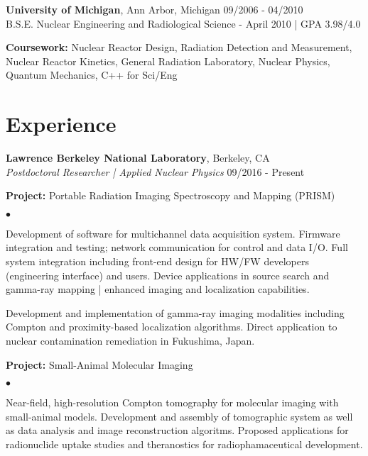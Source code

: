 \documentclass[margin,line]{res}
\newenvironment{list1}{
  \begin{list}{\ding{113}}{%
      \setlength{\itemsep}{0in}
      \setlength{\parsep}{0in} \setlength{\parskip}{0in}
      \setlength{\topsep}{0in} \setlength{\partopsep}{0in} 
      \setlength{\leftmargin}{0.17in}}}{\end{list}}
\newenvironment{list2}{
  \begin{list}{$\bullet$}{%
      \setlength{\itemsep}{0in}
      \setlength{\parsep}{0in} \setlength{\parskip}{0in}
      \setlength{\topsep}{0in} \setlength{\partopsep}{0in} 
      \setlength{\leftmargin}{0.2in}}}{\end{list}}
\begin{document}
\begin{resume}
{\bf University of Michigan}, Ann Arbor, Michigan \hfill 09/2006 - 04/2010\\
B.S.E. Nuclear Engineering and Radiological Science - April 2010 | GPA 3.98/4.0
\begin{list1}
\item[] {\bf \small Coursework:} Nuclear Reactor Design, Radiation Detection 
                                 and Measurement, Nuclear Reactor Kinetics,
                                 General Radiation Laboratory, Nuclear Physics,
                                 Quantum Mechanics, C++ for Sci/Eng
\end{list1}

\section{\sc Experience}
{\bf Lawrence Berkeley National Laboratory}, Berkeley, CA \\
{\em Postdoctoral Researcher | Applied Nuclear Physics} \hfill 09/2016 - Present

\begin{list1}
  \item[] {\bf \small Project:} Portable Radiation Imaging Spectroscopy and Mapping (PRISM)
  \begin{list2}
    \item Development of software for multichannel data acquisition system.
          Firmware integration and testing; network communication for control and data I/O.
          Full system integration including front-end design for HW/FW developers
          (engineering interface) and users.
          Device applications in source search and gamma-ray mapping | enhanced imaging
          and localization capabilities.
    \item Development and implementation of gamma-ray imaging modalities including
          Compton and proximity-based localization algorithms.
          Direct application to nuclear contamination remediation in 
          Fukushima, Japan.
  \end{list2}
  \item[] {\bf \small Project:} Small-Animal Molecular Imaging
  \begin{list2}
    \item Near-field, high-resolution Compton tomography for molecular imaging
          with small-animal models.
          Development and assembly of tomographic system as well as data 
          analysis and image reconstruction algoritms.
          Proposed applications for radionuclide uptake studies and theranostics
          for radiophamaceutical development.
  \end{list2}
\end{list1}


\end{resume}
\end{document}
